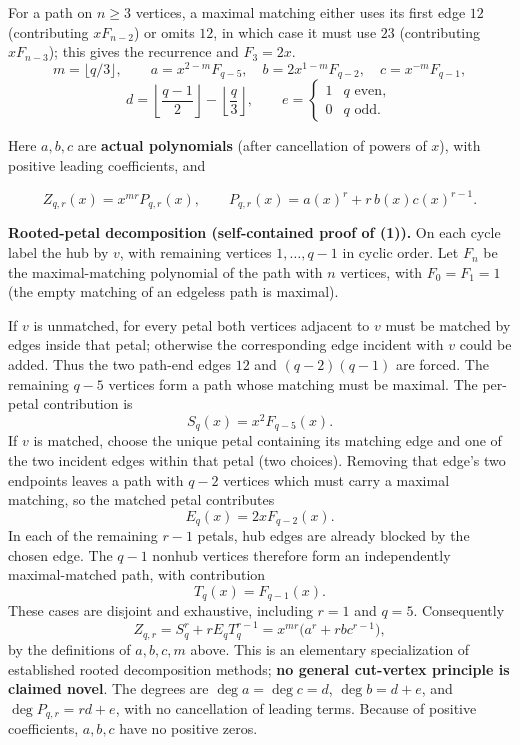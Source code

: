 \documentclass[
  10pt,
]{article}
\begin{document}
For a path on \(n\ge3\) vertices, a maximal matching either uses its
first edge \(12\) (contributing \(xF_{n-2}\)) or omits \(12\), in which
case it must use \(23\) (contributing \(xF_{n-3}\)); this gives the
recurrence and \(F_3=2x\). \[
 m=\lfloor q/3\rfloor,\qquad
 a=x^{2-m}F_{q-5},\quad b=2x^{1-m}F_{q-2},\quad c=x^{-m}F_{q-1},
\] \[
 d=\left\lfloor\frac{q-1}{2}\right\rfloor-\left\lfloor\frac q3\right\rfloor,
 \qquad e=\begin{cases}1&q\text{ even},\\0&q\text{ odd}.\end{cases}
\]

Here \(a,b,c\) are \textbf{actual polynomials} (after cancellation of
powers of \(x\)), with positive leading coefficients, and

\[
 Z_{q,r}(x)=x^{mr}P_{q,r}(x),\qquad
 P_{q,r}(x)=a(x)^r+r\,b(x)c(x)^{r-1}.
 \tag{1}
\]

\textbf{Rooted-petal decomposition (self-contained proof of (1)).} On
each cycle label the hub by \(v\), with remaining vertices
\(1,\ldots,q-1\) in cyclic order. Let \(F_n\) be the maximal-matching
polynomial of the path with \(n\) vertices, with \(F_0=F_1=1\) (the
empty matching of an edgeless path is maximal).

If \(v\) is unmatched, for every petal both vertices adjacent to \(v\)
must be matched by edges inside that petal; otherwise the corresponding
edge incident with \(v\) could be added. Thus the two path-end edges
\(12\) and \((q-2)(q-1)\) are forced. The remaining \(q-5\) vertices
form a path whose matching must be maximal. The per-petal contribution
is \[
  S_q(x)=x^2 F_{q-5}(x).
\] If \(v\) is matched, choose the unique petal containing its matching
edge and one of the two incident edges within that petal (two choices).
Removing that edge's two endpoints leaves a path with \(q-2\) vertices
which must carry a maximal matching, so the matched petal contributes \[
  E_q(x)=2xF_{q-2}(x).
\] In each of the remaining \(r-1\) petals, hub edges are already
blocked by the chosen edge. The \(q-1\) nonhub vertices therefore form
an independently maximal-matched path, with contribution \[
  T_q(x)=F_{q-1}(x).
\] These cases are disjoint and exhaustive, including \(r=1\) and
\(q=5\). Consequently \[
Z_{q,r}=S_q^r+rE_qT_q^{r-1}
=x^{mr}\bigl(a^r+rbc^{r-1}\bigr),
\] by the definitions of \(a,b,c,m\) above. This is an elementary
specialization of established rooted decomposition methods; \textbf{no
general cut-vertex principle is claimed novel}. The degrees are
\(\deg a=\deg c=d\), \(\deg b=d+e\), and \(\deg P_{q,r}=rd+e\), with no
cancellation of leading terms. Because of positive coefficients,
\(a,b,c\) have no positive zeros.
\end{document}
